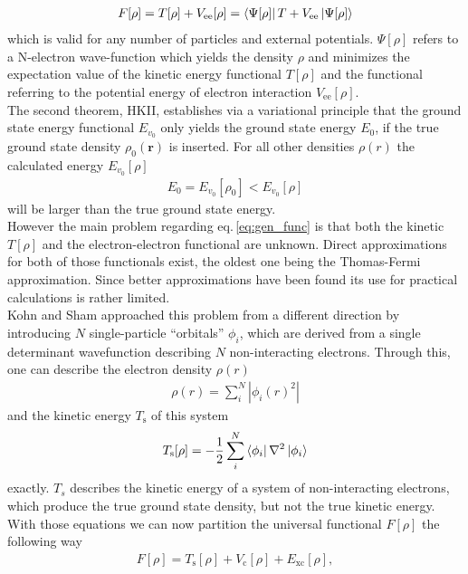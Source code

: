 \begin{align} \label{eq:gen_func}
    F[\rho] = T[\rho] + V_{\mathrm{ee}}[\rho] = \bra{\Psi[\rho]}T+V_{\mathrm{ee}}\ket{\Psi[\rho]}
\end{align}
which is valid for any number of particles and external potentials. $\Psi[\rho]$ refers to a N-electron wave-function which yields the density $\rho$ and minimizes the expectation value of the kinetic energy functional $T[\rho]$ and the functional referring to the potential energy of electron interaction $V_{\mathrm{ee}}[\rho]$. \\
The second theorem, HKII, establishes via a variational principle that the ground state energy functional $E_{v_0}$ only yields the ground state energy $E_{0}$, if the true ground state density $\rho_{0}(\textbf{r})$ is inserted. For all other densities $\rho(r)$ the calculated energy $E_{v_0}[\rho]$
\begin{align}
    E_{0} = E_{v_0}[\rho_{0}] < E_{v_0}[\rho]
\end{align}
will be larger than the true ground state energy. \\
However the main problem regarding eq.\,\ref{eq:gen_func} is that both the kinetic $T[\rho]$ and the electron-electron functional are unknown. Direct approximations for both of those functionals exist, the oldest one being the Thomas-Fermi approximation.\cite{DFT_4} Since better approximations have been found its use for practical calculations is rather limited.\\
Kohn and Sham approached this problem from a different direction by introducing $N$ single-particle ``orbitals'' $\phi_{i}$, which are derived from a single determinant wavefunction describing $N$ non-interacting electrons.\cite{DFT_5} Through this, one can describe the electron density $\rho(r)$
\begin{align}\label{eq:HK_orbitals}
    \rho(r) = \sum^{N}_{i} |{\phi_{i}(r)^2}|
\end{align}
and the kinetic energy $T_{\mathrm{s}}$ of this system
\begin{align}
    T_{\mathrm{s}}[\rho] = - \frac{1}{2}\sum^{N}_{i} \bra{\phi_{i}}\nabla^2\ket{\phi_{i}}
\end{align}
exactly. $T_{s}$ describes the kinetic energy of a system of non-interacting electrons, which produce the true ground state density, but not the true kinetic energy. \\
With those equations we can now partition the universal functional $F[\rho]$ the following way
\begin{align} \label{eq:KS_functional}
    F[\rho] = T_{\mathrm{s}}[\rho] + V_{\mathrm{c}}[\rho] + E_{\mathrm{xc}}[\rho],
\end{align}

